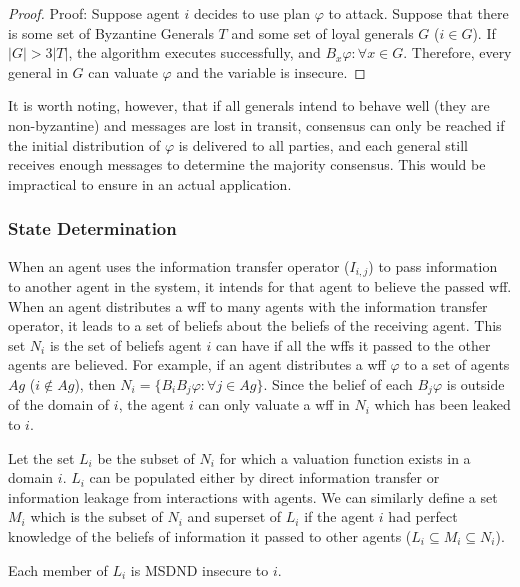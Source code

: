 \begin{proof}
Proof: Suppose agent $i$ decides to use plan $\varphi$ to attack. Suppose that there is some set of Byzantine Generals $T$ and some set of loyal generals $G$ ($i \in G$). If $|G| > 3|T|$, the algorithm executes successfully, and $B_x \varphi : \forall x \in G $. Therefore, every general in $G$ can valuate $\varphi$ and the variable is insecure.
\end{proof}

It is worth noting, however, that if all generals intend to behave well (they are non-byzantine) and messages are lost in transit, consensus can only be reached if the initial distribution of $\varphi$ is delivered to all parties, and each general still receives enough messages to determine the majority consensus. This would be impractical to ensure in an actual application.

\subsubsection{State Determination}

When an agent uses the information transfer operator ($I_{i,j}$) to pass information to another agent in the system, it intends for that agent to believe the passed wff. When an agent distributes a wff to many agents with the information transfer operator, it leads to a set of beliefs about the beliefs of the receiving agent. This set $N_i$ is the set of beliefs agent $i$ can have if all the wffs it passed to the other agents are believed. For example, if an agent distributes a wff $\varphi$ to a set of agents $Ag$ ($i \not \in Ag$), then $N_i = \{ B_i B_j \varphi : \forall j \in Ag \}$. Since the belief of each $B_j \varphi$ is outside of the domain of $i$, the agent $i$ can only valuate a wff in $N_i$ which has been leaked to $i$.

Let the set $L_i$ be the subset of $N_i$ for which a valuation function exists in a domain $i$. $L_i$ can be populated either by direct information transfer or information leakage from interactions with agents. We can similarly define a set $M_i$ which is the subset of $N_i$ and superset of $L_i$ if the agent $i$ had perfect knowledge of the beliefs of information it passed to other agents ($L_i \subseteq M_i \subseteq N_i$).

\begin{thm}
Each member of $L_i$ is MSDND insecure to $i$.
\end{thm}

